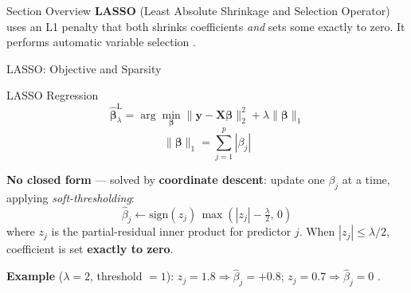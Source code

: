 \documentclass[aspectratio=169, 10pt]{beamer}
\begin{document}
\begin{frame}{Section Overview}
  \textbf{LASSO} (Least Absolute Shrinkage and Selection Operator) uses an L1
  penalty that both shrinks coefficients \emph{and} sets some exactly to zero.
  It performs automatic variable selection \parencite{Tibshirani1996}.
\end{frame}

\begin{frame}{LASSO: Objective and Sparsity}
  \begin{definitionbox}{LASSO Regression}
    \[
      \hat{\bm{\beta}}^{\mathrm{L}}_\lambda
      = \arg\min_{\bm{\beta}} \|\mathbf{y} - \mathbf{X}\bm{\beta}\|_2^2
        + \lambda \|\bm{\beta}\|_1
    \]
    \[
      \|\bm{\beta}\|_1 = \sum_{j=1}^{p} |\beta_j|
    \]
  \end{definitionbox}

  \smallskip
  \textbf{No closed form} — solved by \textbf{coordinate descent}:
  update one $\beta_j$ at a time, applying \emph{soft-thresholding}:
  \[
    \hat{\beta}_j \leftarrow
    \mathrm{sign}(z_j)\,\max\!\left(|z_j| - \tfrac{\lambda}{2},\, 0\right)
  \]
  where $z_j$ is the partial-residual inner product for predictor $j$.
  When $|z_j| \leq \lambda/2$, coefficient is set \textbf{exactly to zero}.

  \smallskip
  {\footnotesize\textbf{Example} ($\lambda=2$, threshold $=1$):
  $z_j = 1.8 \Rightarrow \hat{\beta}_j = +0.8$;\quad
  $z_j = 0.7 \Rightarrow \hat{\beta}_j = 0$ .}
\end{frame}
\end{document}

